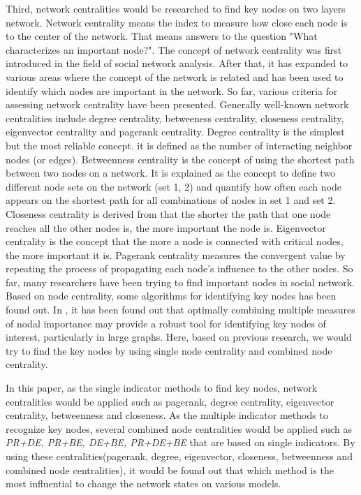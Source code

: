 Third, network centralities would be researched to find key nodes on two layers network. Network centrality means the index to measure how close each node is to the center of the network. That means answers to the question "What characterizes an important node?". The concept of network centrality was first introduced in the field of social network analysis.\parencite{freeman1979} After that, it has expanded to various areas where the concept of the network is related and has been used to identify which nodes are important in the network. So far, various criteria for assessing network centrality have been presented. Generally well-known network centralities include degree centrality, betweeness centrality, closeness centrality, eigenvector centrality and pagerank centrality.\parencite{koschutzki2008, francisco2019, bianconi2018}
Degree centrality is the simplest but the most reliable concept. it is defined as the number of interacting neighbor nodes (or edges). Betweenness centrality is the concept of using the shortest path between two nodes on a network. It is explained as the concept to  define two different node sets on the network (set 1, 2) and quantify how often each node appears on the shortest path for all combinations of nodes in set 1 and set 2. Closeness centrality is derived from that the shorter the path that one node reaches all the other nodes is, the more important the node is. Eigenvector centrality is the concept that the more a node is connected with critical nodes, the more important it is. Pagerank centrality measures the convergent value by repeating the process of propagating each node's influence to the other nodes. 
So far, many researchers have been trying to find important nodes in social network.\parencite{eom2015, white2003, mesgari2015, hwang1981, huang2014} Based on node centrality, some algorithms for identifying key nodes has been found out. In \parencite{mesgari2015, huang2014}, it has been found out that optimally combining multiple measures of nodal importance may provide a robust tool for identifying key nodes of interest, particularly in large graphs. Here, based on previous research, we would try to find the key nodes by using single node centrality and combined node centrality. 

In this paper, as the single indicator methods to find key nodes, network centralities would be applied such as pagerank, degree centrality, eigenvector centrality, betweenness and closeness. As the multiple indicator methods to recognize key nodes, several combined node centralities would be applied such as \textit{PR+DE, PR+BE, DE+BE, PR+DE+BE} that are based on single indicators.  By using these centralities(pagerank, degree, eigenvector, closeness, betweenness and combined node centralities), it would be found out that which method is the most influential to change the network states on various models.  


